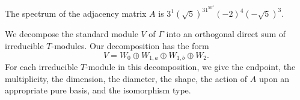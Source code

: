 \documentclass[12pt,letterpaper]{article}
\begin{document}
The spectrum of the adjacency matrix $A$ is $ 3^1(\sqrt5)^31^50^4(-2)^4(-\sqrt5)^3 $.

We decompose the standard module $V$ of $\Gamma$ into an orthogonal direct sum of irreducible $T$-modules. Our decomposition has the form
\[ V = W_0 \oplus W_{1,a} \oplus W_{1,b} \oplus W_2. \]
For each irreducible $T$-module in this decomposition, we give the endpoint, the multiplicity, the dimension, the diameter, the shape, the action of $A$ upon an appropriate pure basis, and the isomorphism type.




\begin{center}
\smallskip
{}
\end{center}
\end{document}
